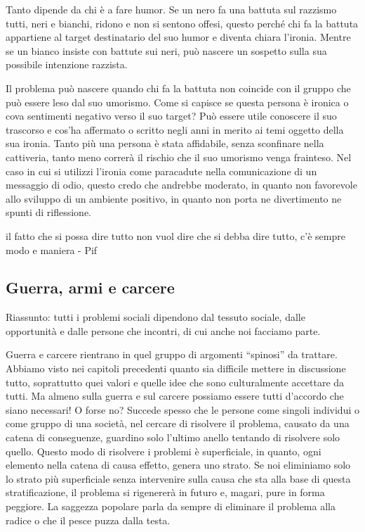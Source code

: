 \documentclass[12pt]{book} %
\begin{document}
\begin{mdframed}[linewidth=1pt]
\bigskip

Tanto dipende da chi è a fare humor. Se un nero fa una battuta sul razzismo tutti, neri e bianchi, ridono e non si
sentono offesi, questo perché chi fa la battuta appartiene al target destinatario del suo humor e diventa chiara
l'ironia. Mentre se un bianco insiste con battute sui neri, può nascere un sospetto sulla sua
possibile intenzione razzista.


\bigskip

Il problema può nascere quando chi fa la battuta non coincide con il gruppo che può essere leso dal suo umorismo. Come
si capisce se questa persona è ironica o cova sentimenti negativo verso il suo target? Può essere utile conoscere il
suo trascorso e cos'ha affermato o scritto negli anni in merito ai temi oggetto della sua ironia.
Tanto più una persona è stata affidabile, senza sconfinare nella cattiveria, tanto meno correrà il rischio che il suo
umorismo venga frainteso. Nel caso in cui si utilizzi l'ironia come paracadute nella comunicazione
di un messaggio di odio, questo credo che andrebbe moderato, in quanto non favorevole allo sviluppo di un ambiente
positivo, in quanto non porta ne divertimento ne spunti di
riflessione.

il fatto che si possa dire tutto non vuol dire che si debba dire tutto, c'è sempre modo e maniera -
Pif
\end{mdframed}

\subsection{Guerra, armi e carcere}
Riassunto: tutti i problemi sociali dipendono dal tessuto sociale, dalle opportunità e dalle persone che incontri, di
cui anche noi facciamo parte.

Guerra e carcere rientrano in quel gruppo di argomenti “spinosi” da trattare. Abbiamo visto nei capitoli precedenti
quanto sia difficile mettere in discussione tutto, soprattutto quei valori e quelle idee che sono culturalmente
accettare da tutti. Ma almeno sulla guerra e sul carcere possiamo essere tutti d'accordo che siano
necessari! O forse no? Succede spesso che le persone come singoli individui o come gruppo di una società, nel cercare
di risolvere il problema, causato da una catena di conseguenze, guardino solo l'ultimo anello
tentando di risolvere solo quello. Questo modo di risolvere i problemi è superficiale, in quanto, ogni elemento nella
catena di causa effetto, genera uno strato. Se noi eliminiamo solo lo strato più superficiale senza intervenire sulla
causa che sta alla base di questa stratificazione, il problema si rigenererà in futuro e, magari, pure in forma
peggiore. La saggezza popolare parla da sempre di eliminare il problema alla radice o che il pesce puzza dalla testa. 
\end{document}
